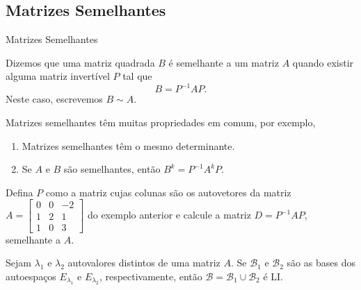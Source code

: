 \subsection*{Matrizes Semelhantes}
\begin{frame}[label=autovalores]{Matrizes Semelhantes}
\begin{defin}
Dizemos que uma {\color{red}matriz quadrada} $B$ é {\color{blue}semelhante} a um matriz $A$ quando existir alguma matriz invertível $P$ tal que 
\[B=P^{-1}AP.\]
Neste caso, escrevemos $B\sim A$.
\end{defin}

Matrizes semelhantes têm muitas propriedades em comum, por exemplo, 

\begin{enumerate}
\item Matrizes semelhantes têm o mesmo determinante.
\item Se $A$ e $B$ são semelhantes, então $B^k=P^{-1}A^kP$.
\end{enumerate}





\end{frame}

\begin{frame}[label=autovalores]{}
\begin{exe}
Defina $P$ como a matriz cujas colunas são os autovetores da matriz $A=\begin{bmatrix}
0 & 0 & -2\\ 1 & 2 & 1 \\ 1 &0& 3
\end{bmatrix}$ do exemplo anterior e calcule a matriz  $D=P^{-1}AP$, semelhante a $A$.
\end{exe}

\begin{teo}
Sejam $\lambda_1$ e $\lambda_2$ {\color{red}autovalores distintos} de uma matriz $A$. Se $\mathcal{B}_1$ e $\mathcal{B}_2$ são as bases dos autoespaços $E_{\lambda_1}$ e $E_{\lambda_2}$, respectivamente, então $\mathcal{B}=\mathcal{B}_1\cup \mathcal{B}_2$ é LI.
\end{teo}

\end{frame}


